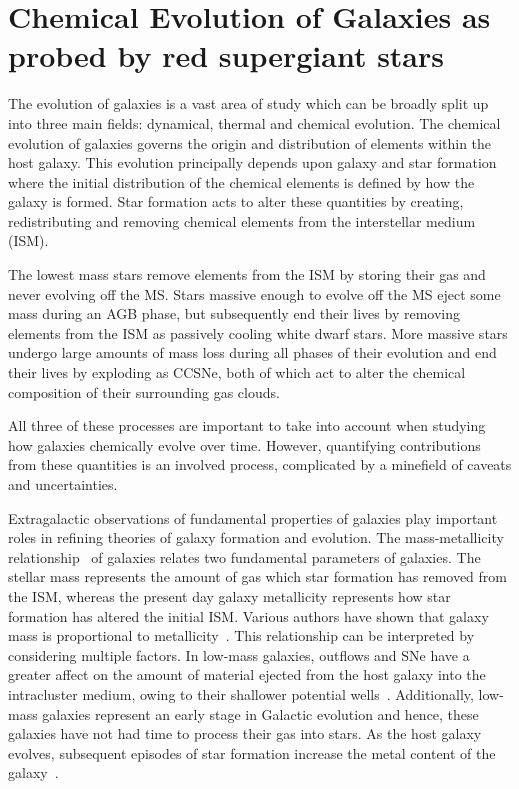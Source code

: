 {%

\section{Chemical Evolution of Galaxies as probed by red supergiant stars} %
\label{sec:chemical evolution}


The evolution of galaxies is a vast area of study which can be broadly split up into three main fields: dynamical, thermal and chemical evolution.
The chemical evolution of galaxies governs the origin and distribution of elements within the host galaxy.
This evolution principally depends upon galaxy and star formation where
the initial distribution of the chemical elements is defined by how the galaxy is formed.
Star formation acts to alter these quantities by creating, redistributing and removing chemical elements from the interstellar medium (ISM).

The lowest mass stars remove elements from the ISM by storing their gas and never evolving off the MS.
Stars massive enough to evolve off the MS eject some mass during an AGB phase, but subsequently end their lives by removing elements from the ISM as passively cooling white dwarf stars.
More massive stars undergo large amounts of mass loss during all phases of their evolution and end their lives by exploding as CCSNe, both of which act to alter the chemical composition of their surrounding gas clouds.

All three of these processes are important to take into account when studying how galaxies chemically evolve over time.
However, quantifying contributions from these quantities is an involved process, complicated by a minefield of caveats and uncertainties.

Extragalactic observations of fundamental properties of galaxies play important roles in refining theories of galaxy formation and evolution.
The mass-metallicity relationship~\citep[MZR;][]{Lequeux79} of galaxies relates two fundamental parameters of galaxies.
The stellar mass represents the amount of gas which star formation has removed from the ISM, whereas the present day galaxy metallicity represents how star formation has altered the initial ISM.
Various authors have shown that galaxy mass is proportional to metallicity~\citep{Tremonti04, Maiolino08,Kewley08}.
This relationship can be interpreted by considering multiple factors.
In low-mass galaxies, outflows and SNe have a greater affect on the amount of material ejected from the host galaxy into the intracluster medium, owing to their shallower potential wells~\citep[e.g.][]{Tremonti04}.
Additionally, low-mass galaxies represent an early stage in Galactic evolution and hence, these galaxies have not had time to process their gas into stars.
As the host galaxy evolves, subsequent episodes of star formation increase the metal content of the galaxy~\citep[e.g.][and references therein]{Maiolino08}.

}

